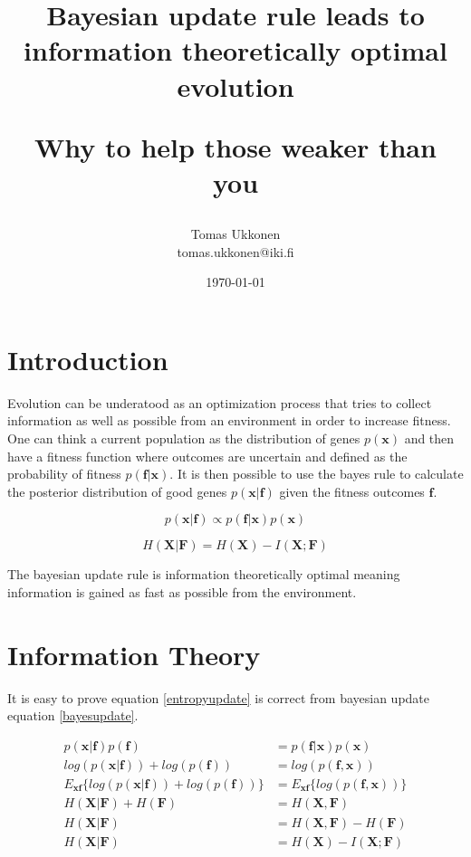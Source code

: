 \documentclass{article}
\title{Bayesian update rule leads to information theoretically optimal evolution\\ \begin{normalsize}Why to help those weaker than you\end{normalsize} }
\author{Tomas Ukkonen\\ \textrm{tomas.ukkonen@iki.fi} }
\date{\today}
\begin{document}
\maketitle

\section{Introduction} \label{introduction}

Evolution can be underatood as an optimization process that tries to collect information  \cite{infobook03} as well as possible from  an environment in order to increase fitness. One can think a current population as the distribution of genes $p(\mathbf{x})$ and then have a fitness function where outcomes are uncertain and defined as the probability of fitness $p(\mathbf{f}|\mathbf{x})$. It is then possible to use the bayes rule \cite{bdanalysis03} to calculate the posterior distribution of good genes $p(\mathbf{x}|\mathbf{f})$ given the fitness outcomes $\mathbf{f}$.

\begin{equation}
\label{bayesupdate}
p(\mathbf{x}|\mathbf{f}) \propto p(\mathbf{f}|\mathbf{x})p(\mathbf{x}) \end{equation}

\begin{equation}
\label{entropyupdate}
H(\mathbf{X}|\mathbf{F}) = H(\mathbf{X}) - I(\mathbf{X};\mathbf{F})
\end{equation}

The bayesian update rule is information theoretically optimal meaning information is gained as fast as possible from the environment.

\section{Information Theory}

It is easy to prove equation \ref{entropyupdate} is correct from bayesian update equation \ref{bayesupdate}.

\begin{equation*}
\begin{aligned}
  p(\bm{x}|\bm{f})p(\bm{f}) &= p(\bm{f}|\bm{x})p(\bm{x})\\
  log(p(\bm{x}|\bm{f})) + log(p(\bm{f})) &= log(p(\bm{f},\bm{x}))\\
  E_{\bm{x}\bm{f}}\{log(p(\bm{x}|\bm{f})) + log(p(\bm{f}))\} &= E_{\bm{x}\bm{f}}\{log(p(\bm{f},\bm{x}))\}\\  
  H(\bm{X}|\bm{F})+H(\bm{F}) &= H(\bm{X},\bm{F}) \\
  H(\bm{X}|\bm{F}) &= H(\bm{X},\bm{F}) - H(\bm{F}) \\
  H(\bm{X}|\bm{F}) &= H(\bm{X}) - I(\bm{X};\bm{F})
\end{aligned}
\end{equation*}
\end{document}
